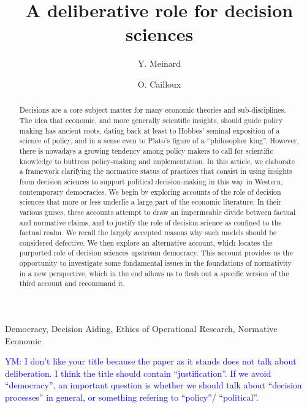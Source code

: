 \documentclass[preprint, french, english, 11pt]{elsarticle}%
\newcommand{\commentYM}[1]{\textcolor{blue}{YM: #1}}
\begin{document}
\title{A deliberative role for decision sciences}

\author[ld]{Y. Meinard}
\author[ld]{O. Cailloux}
\address[ld]{Universit\'e Paris-Dauphine, PSL Research University, CNRS, UMR [7243], LAMSADE, 75016 PARIS, FRANCE}

\begin{abstract}
Decisions are a core subject matter for many economic theories and sub-disciplines. The idea that economic, and more generally scientific insights, should guide policy making has ancient roots, dating back at least to Hobbes’ seminal exposition of a science of policy, and in a sense even to Plato's figure of a ``philosopher king''. However, there is nowadays a growing tendency among policy makers to call for scientific knowledge to buttress policy-making and implementation. In this article, we elaborate a framework clarifying the normative status of practices that consist in using insights from decision sciences to support political decision-making in this way in Western, contemporary democracies. We begin by exploring accounts of the role of decision sciences that more or less underlie a large part of the economic literature. In their various guises, these accounts attempt to draw an impermeable divide between factual and normative claims, and to justify the role of decision science as confined to the factual realm. We recall the largely accepted reasons why such models should be considered defective. We then explore an alternative account, which locates the purported role of decision sciences upstream democracy. This account provides us the opportunity to investigate some fondamental issues in the foundations of normativity in a new perspective, which in the end allows us to flesh out a specific version of the third account and recommand it.
\end{abstract}

\begin{keyword}
Democracy, Decision Aiding, Ethics of Operational Research, Normative Economic
\end{keyword}

\maketitle
\commentYM{I don't like your title because the paper as it stands does not talk about deliberation. I think the title should contain ``justification''. If we avoid ``democracy'', an important question is whether we should talk about ``decision processes'' in general, or something refering to ``policy''/ ``political''. }
\end{document}
